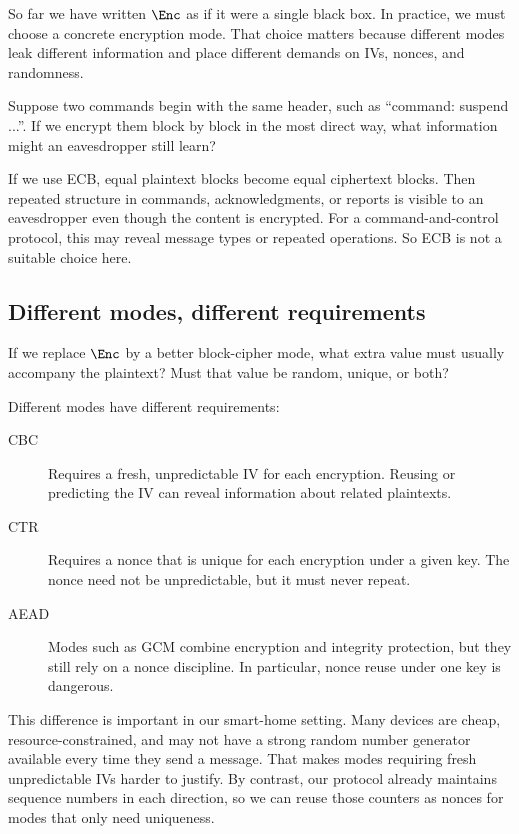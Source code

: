 So far we have written \(\Enc\) as if it were a single black box.
In practice, we must choose a concrete encryption mode.
That choice matters because different modes leak different information and
place different demands on IVs, nonces, and randomness.

\begin{exercise}
  Suppose two commands begin with the same header, such as
  \enquote{command: suspend ...}.
  If we encrypt them block by block in the most direct way, what information
  might an eavesdropper still learn?
\end{exercise}

If we use \ac{ECB}, equal plaintext blocks become equal ciphertext blocks.
Then repeated structure in commands, acknowledgments, or reports is visible to
an eavesdropper even though the content is encrypted.
For a command-and-control protocol, this may reveal message types or repeated
operations.
So \ac{ECB} is not a suitable choice here.

\subsection{Different modes, different requirements}

\begin{exercise}
  If we replace \(\Enc\) by a better block-cipher mode, what extra value must
  usually accompany the plaintext?
  Must that value be random, unique, or both?
\end{exercise}

Different modes have different requirements:
\begin{description}
  \item[\ac{CBC}] Requires a fresh, unpredictable IV for each encryption.
    Reusing or predicting the IV can reveal information about related
    plaintexts.
  \item[\ac{CTR}] Requires a nonce that is unique for each encryption under a
    given key.
    The nonce need not be unpredictable, but it must never repeat.
  \item[\ac{AEAD}] Modes such as \ac{GCM} combine encryption and integrity
    protection, but they still rely on a nonce discipline.
    In particular, nonce reuse under one key is dangerous.
\end{description}

This difference is important in our smart-home setting.
Many devices are cheap, resource-constrained, and may not have a strong random
number generator available every time they send a message.
That makes modes requiring fresh unpredictable IVs harder to justify.
By contrast, our protocol already maintains sequence numbers in each
direction, so we can reuse those counters as nonces for modes that only need
uniqueness.

